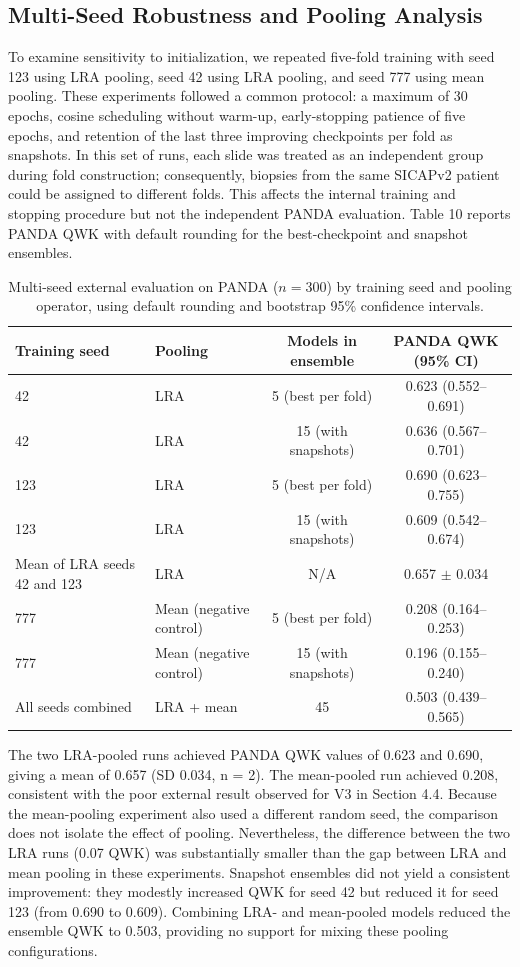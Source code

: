 \documentclass[11pt,a4paper]{article}
\begin{document}
\subsection{Multi-Seed Robustness and Pooling Analysis}
To examine sensitivity to initialization, we repeated five-fold training with seed 123 using LRA pooling, seed 42 using LRA pooling, and seed 777 using mean pooling. These experiments followed a common protocol: a maximum of 30 epochs, cosine scheduling without warm-up, early-stopping patience of five epochs, and retention of the last three improving checkpoints per fold as snapshots. In this set of runs, each slide was treated as an independent group during fold construction; consequently, biopsies from the same SICAPv2 patient could be assigned to different folds. This affects the internal training and stopping procedure but not the independent PANDA evaluation. Table 10 reports PANDA QWK with default rounding for the best-checkpoint and snapshot ensembles.


\begin{table}[H]
\centering
\small
\renewcommand{\arraystretch}{1.15}
\caption{Multi-seed external evaluation on PANDA ($n = 300$) by training seed and pooling operator, using default rounding and bootstrap 95\% confidence intervals.}
\label{tab:multi_seed}
\begin{tabularx}{\textwidth}{llcc}
\toprule
\textbf{Training seed} & \textbf{Pooling} & \textbf{Models in ensemble} & \textbf{PANDA QWK (95\% CI)} \\
\midrule
42 & LRA & 5 (best per fold) & 0.623 (0.552--0.691) \\
42 & LRA & 15 (with snapshots) & 0.636 (0.567--0.701) \\
123 & LRA & 5 (best per fold) & 0.690 (0.623--0.755) \\
123 & LRA & 15 (with snapshots) & 0.609 (0.542--0.674) \\
Mean of LRA seeds 42 and 123 & LRA & N/A & 0.657 $\pm$ 0.034 \\
777 & Mean (negative control) & 5 (best per fold) & 0.208 (0.164--0.253) \\
777 & Mean (negative control) & 15 (with snapshots) & 0.196 (0.155--0.240) \\
All seeds combined & LRA + mean & 45 & 0.503 (0.439--0.565) \\
\bottomrule
\end{tabularx}
\end{table}

The two LRA-pooled runs achieved PANDA QWK values of 0.623 and 0.690, giving a mean of 0.657 (SD 0.034, n = 2). The mean-pooled run achieved 0.208, consistent with the poor external result observed for V3 in Section 4.4. Because the mean-pooling experiment also used a different random seed, the comparison does not isolate the effect of pooling. Nevertheless, the difference between the two LRA runs (0.07 QWK) was substantially smaller than the gap between LRA and mean pooling in these experiments. Snapshot ensembles did not yield a consistent improvement: they modestly increased QWK for seed 42 but reduced it for seed 123 (from 0.690 to 0.609). Combining LRA- and mean-pooled models reduced the ensemble QWK to 0.503, providing no support for mixing these pooling configurations.
\end{document}
